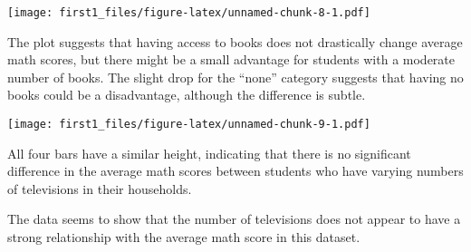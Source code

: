 \documentclass[
]{article}
\newenvironment{Shaded}{\begin{snugshade}}{\end{snugshade}}
\newcommand{\AttributeTok}[1]{\textcolor[rgb]{0.13,0.29,0.53}{#1}}
\newcommand{\CommentTok}[1]{\textcolor[rgb]{0.56,0.35,0.01}{\textit{#1}}}
\newcommand{\FunctionTok}[1]{\textcolor[rgb]{0.13,0.29,0.53}{\textbf{#1}}}
\newcommand{\NormalTok}[1]{#1}
\newcommand{\OtherTok}[1]{\textcolor[rgb]{0.56,0.35,0.01}{#1}}
\newcommand{\SpecialCharTok}[1]{\textcolor[rgb]{0.81,0.36,0.00}{\textbf{#1}}}
\newcommand{\StringTok}[1]{\textcolor[rgb]{0.31,0.60,0.02}{#1}}
\begin{document}
\texttt{[image: first1\_files/figure-latex/unnamed-chunk-8-1.pdf]}

The plot suggests that having access to books does not drastically
change average math scores, but there might be a small advantage for
students with a moderate number of books. The slight drop for the
``none'' category suggests that having no books could be a disadvantage,
although the difference is subtle.

\begin{Shaded}
\end{Shaded}

\texttt{[image: first1\_files/figure-latex/unnamed-chunk-9-1.pdf]}

All four bars have a similar height, indicating that there is no
significant difference in the average math scores between students who
have varying numbers of televisions in their households.

The data seems to show that the number of televisions does not appear to
have a strong relationship with the average math score in this dataset.
\end{document}
